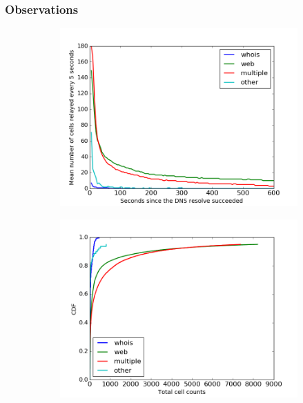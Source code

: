 \subsubsection{Observations}

\begin{figure}
	\centering
	\begin{subfigure}[t]{0.32\textwidth}
		\centering
		\includegraphics[scale=0.3]{images/exitmeasurement.png}
		\label{fig:stats_a}
	\end{subfigure}
	\begin{subfigure}[t]{0.32\textwidth}
		\centering
		\includegraphics[scale=0.3]{images/totcellcountscdf.png}
		\label{fig:stats_b}
	\end{subfigure}

\end{figure}
